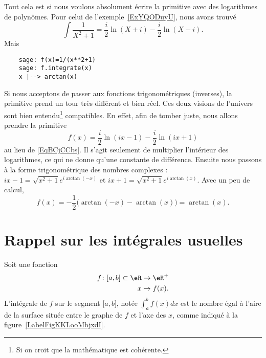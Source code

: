 \begin{remark}
	Tout cela est si nous voulons absolument écrire la primitive avec des logarithmes de polynômes. Pour celui de l'exemple~\ref{ExYQODuyU}, nous avons trouvé
	\begin{equation}    \label{EqBCjCCbs}
		\int\frac{1}{ X^2+1 }=\frac{ i }{2}\ln(X+i)-\frac{ i }{2}\ln(X-i).
	\end{equation}
	Mais
	\begin{verbatim}
    sage: f(x)=1/(x**2+1)
    sage: f.integrate(x)
    x |--> arctan(x)
    \end{verbatim}
	Si nous acceptons de passer aux fonctions trigonométriques (inverses), la primitive prend un tour très différent et bien réel. Ces deux visions de l'univers sont bien entendu\footnote{Si on croit que la mathématique est cohérente.} compatibles. En effet, afin de tomber juste, nous allons prendre la primitive
	\begin{equation}
		f(x)=\frac{ i }{2}\ln(ix-1)-\frac{ i }{2}\ln(ix+1)
	\end{equation}
	au lieu de \eqref{EqBCjCCbs}. Il s'agit seulement de multiplier l'intérieur des logarithmes, ce qui ne donne qu'une constante de différence. Ensuite nous passons à la forme trigonométrique des nombres complexes : \( ix-1=\sqrt{x^2+1} e^{i\arctan(-x)}\) et \( ix+1=\sqrt{x^2+1} e^{i\arctan(x)}\). Avec un peu de calcul,
	\begin{equation}
		f(x)=-\frac{ 1 }{2}\Big( \arctan(-x)-\arctan(x) \Big)=\arctan(x).
	\end{equation}
\end{remark}


\section{Rappel sur les intégrales usuelles}

Soit une fonction
\begin{equation}
	\begin{aligned}
		f\colon \mathopen[ a , b \mathclose]\subset\eR & \to \eR^+      \\
		x                                              & \mapsto f(x) .
	\end{aligned}
\end{equation}
L'intégrale de \( f\) sur le segment \( \mathopen[ a , b \mathclose]\), notée \( \int_a^bf(x)dx\) est le nombre égal à l'aire de la surface située entre le graphe de \( f\) et l'axe des \( x\), comme indiqué à la figure~\ref{LabelFigKKLooMbjxdI}. %
\newcommand{\CaptionFigKKLooMbjxdI}{L'intégrale de \( f\) entre \( a\) et \( b\) représente la surface sous la fonction.}


